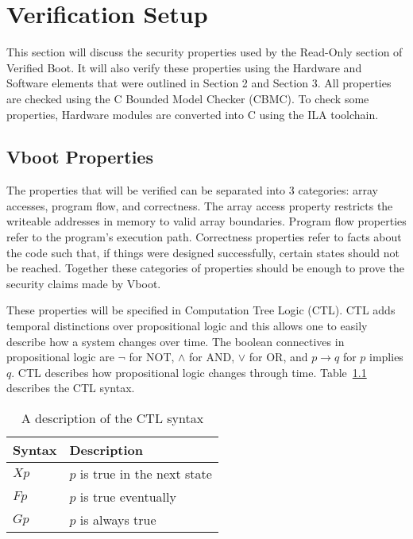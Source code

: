\chapter{Verification Setup}\label{sec:Verif}

This section will discuss the security properties used by the Read-Only
section of Verified Boot. 
It will also verify these properties using the Hardware and
Software elements that were outlined in Section 2 and Section 3.
All properties are checked using the C Bounded Model Checker (CBMC).
To check some properties, Hardware modules are converted into C using the ILA toolchain.

\section{Vboot Properties}

The properties that will be verified can be separated into 3 categories: array accesses, program flow, and correctness.
The array access property restricts the writeable addresses in memory to valid array boundaries. 
Program flow properties refer to the program's execution path.
Correctness properties refer to facts about the code such that, if things were
designed successfully, certain states should not be reached.
Together these categories of properties should be enough to prove the security claims made by Vboot.

These properties will be specified in Computation Tree Logic (CTL). 
CTL adds temporal distinctions over propositional logic and this allows one to easily describe how a system changes over time.
The boolean connectives in propositional logic are $\lnot$ for NOT, $\land$ for
AND, $\lor$ for OR, and $p \to q$ for $p$ implies $q$.
CTL describes how propositional logic changes through time.
Table~\ref{ctl_syn} describes the CTL syntax.

\begin{table}[!htbp]
    \centering
    \caption{A description of the CTL syntax}\label{ctl_syn}
    \begin{tabular}{ll}
        \toprule Syntax & Description  \\ \midrule 
        $Xp$ & $p$ is true in the next state\\ 
        $Fp$ & $p$ is true eventually\\ 
        $Gp$ & $p$ is always true\\ \bottomrule
    \end{tabular}
\end{table}


